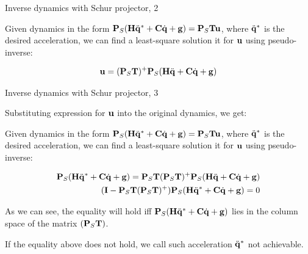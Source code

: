 \documentclass{beamer}
\begin{document}
\begin{frame}{Inverse dynamics with Schur projector, 2}
	\begin{flushleft}
		
		Given dynamics in the form $\mathbf{P}_S(\mathbf{H}\ddot{\mathbf{q}}^* + \mathbf{C}\dot{\mathbf{q}}+ \mathbf{g}) = \mathbf{P}_S\mathbf{T}\mathbf{u}$, where $\ddot{\mathbf{q}}^*$ is the desired acceleration, we can find a least-square solution it for $\mathbf{u}$ using pseudo-inverse:
		
		\begin{align}
			\mathbf{u}
			=
			(\mathbf{P}_S\mathbf{T})^+\mathbf{P}_S(\mathbf{H}\ddot{\mathbf{q}} + \mathbf{C}\dot{\mathbf{q}}+ \mathbf{g})
		\end{align}
		
		
	\end{flushleft}
\end{frame}



\begin{frame}{Inverse dynamics with Schur projector, 3}
	\begin{flushleft}
		
		Substituting expression for  $\mathbf{u}$ into the original dynamics, we get:
		
		Given dynamics in the form $\mathbf{P}_S(\mathbf{H}\ddot{\mathbf{q}}^* + \mathbf{C}\dot{\mathbf{q}}+ \mathbf{g}) = \mathbf{P}_S\mathbf{T}\mathbf{u}$, where $\ddot{\mathbf{q}}^*$ is the desired acceleration, we can find a least-square solution it for $\mathbf{u}$ using pseudo-inverse:
		
		\begin{align}
			\mathbf{P}_S(\mathbf{H}\ddot{\mathbf{q}}^* + \mathbf{C}\dot{\mathbf{q}}+ \mathbf{g}) = \mathbf{P}_S\mathbf{T}(\mathbf{P}_S\mathbf{T})^+\mathbf{P}_S(\mathbf{H}\ddot{\mathbf{q}} + \mathbf{C}\dot{\mathbf{q}}+ \mathbf{g})
			\\
			(\mathbf{I}-\mathbf{P}_S\mathbf{T}(\mathbf{P}_S\mathbf{T})^+)\mathbf{P}_S(\mathbf{H}\ddot{\mathbf{q}}^* + \mathbf{C}\dot{\mathbf{q}}+ \mathbf{g}) = 0
		\end{align}
		
		As we can see, the equality will hold iff $\mathbf{P}_S(\mathbf{H}\ddot{\mathbf{q}}^* + \mathbf{C}\dot{\mathbf{q}}+ \mathbf{g})$ lies in the column space of the matrix $(\mathbf{P}_S\mathbf{T})$.
		
		\bigskip
		
		If the equality above does not hold, we call such acceleration $\ddot{\mathbf{q}}^*$ not achievable.
		
	\end{flushleft}
\end{frame}
\end{document}
